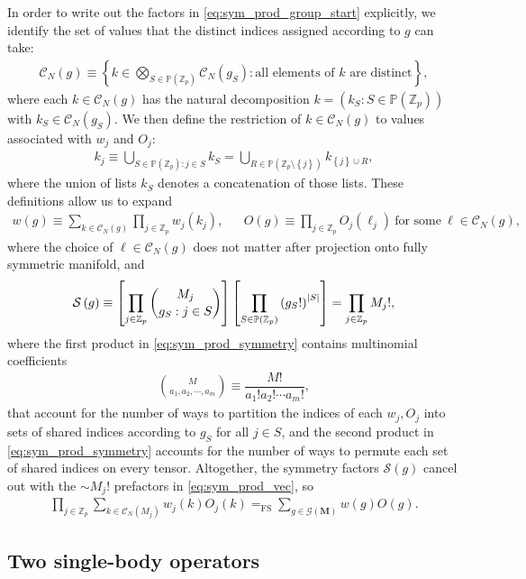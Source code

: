 \documentclass[nofootinbib,notitlepage,11pt]{revtex4-2}
\renewcommand{\t}{\text} %
\newcommand{\f}[2]{\dfrac{#1}{#2}} %
\newcommand{\p}[1]{\left(#1\right)} %
\renewcommand{\sp}[1]{\left[#1\right]} %
\renewcommand{\set}[1]{\left\{#1\right\}} %
\newcommand{\m}{\bm} %
\newcommand{\1}{\mathds{1}}
\newcommand{\C}{\mathcal{C}}
\newcommand{\G}{\mathcal{G}}
\renewcommand{\S}{\mathcal{S}}
\newcommand{\PP}{\mathbb{P}}
\newcommand{\ZZ}{\mathbb{Z}}
\newcommand{\EQFS}{=_{\text{FS}}}
\begin{document}
In order to write out the factors in \eqref{eq:sym_prod_group_start}
explicitly, we identify the set of values that the distinct indices
assigned according to $g$ can take:
\begin{align}
  \C_N\p{g}
  \equiv \set{ k \in \bigotimes_{S\in\PP\p{\ZZ_p}} \C_N\p{g_S}
    : \t{all elements of $k$ are distinct} },
\end{align}
where each $k\in\C_N\p{g}$ has the natural decomposition
$k=\p{k_S:S\in\PP\p{\ZZ_p}}$ with $k_S\in\C_N\p{g_S}$.  We then define
the restriction of $k\in\C_N\p{g}$ to values associated with $w_j$ and
$O_j$:
\begin{align}
  k_j \equiv \bigcup_{S\in\PP\p{\ZZ_p} : j\in S} k_S
  = \bigcup_{R\in\PP\p{\ZZ_p\setminus\set{j}}} k_{\set{j}\cup R},
\end{align}
where the union of lists $k_S$ denotes a concatenation of those lists.
These definitions allow us to expand
\begin{align}
  w\p{g} \equiv \sum_{k\in\C_N\p{g}} \prod_{j\in\ZZ_p} w_j\p{k_j},
  &&
  O\p{g} \equiv \prod_{j\in\ZZ_p}
  O_j\p{\ell_j}~\t{for some}~\ell\in\C_N\p{g},
\end{align}
where the choice of $\ell\in\C_N\p{g}$ does not matter after
projection onto fully symmetric manifold, and
\begin{align}
  \S\p{g} \equiv \sp{\prod_{j\in\ZZ_p} { M_j \choose g_S : j\in S }}
  \sp{\prod_{S\in\PP\p{\ZZ_p}} \p{g_S!}^\abs{S}}
  = \prod_{j\in\ZZ_p} M_j!,
  \label{eq:sym_prod_symmetry}
\end{align}
where the first product in \eqref{eq:sym_prod_symmetry} contains
multinomial coefficients
\begin{align}
  { M \choose a_1, a_2, \cdots, a_m }
  \equiv \f{M!}{a_1!a_2!\cdots a_m!},
\end{align}
that account for the number of ways to partition the indices of each
$w_j,O_j$ into sets of shared indices according to $g_S$ for all
$j\in S$, and the second product in \eqref{eq:sym_prod_symmetry}
accounts for the number of ways to permute each set of shared indices
on every tensor.  Altogether, the symmetry factors $\S\p{g}$ cancel
out with the $\sim M_j!$ prefactors in \eqref{eq:sym_prod_vec}, so
\begin{align}
  \prod_{j\in\ZZ_p} \sum_{k\in\C_N\p{M_j}} w_j\p{k} O_j\p{k}
  \EQFS \sum_{g\in\G\p{\m M}} w\p{g} O\p{g}.
  \label{eq:sym_prod_group}
\end{align}

\subsection{Two single-body operators}
\label{sec:PXYP}
\end{document}

